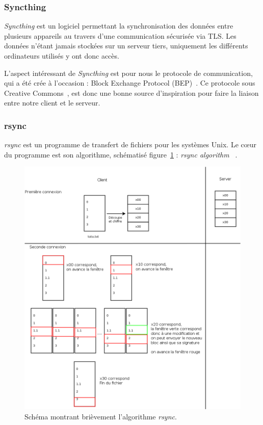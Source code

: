 \documentclass[a4paper,10pt, twoside]{report}
\begin{document}
\begin{spacing}{1.2}
\subsubsection{Syncthing}

\textit{Syncthing} est un logiciel permettant la synchronisation des données
entre plusieurs appareils au travers d'une communication sécurisée via TLS.
Les données n'étant jamais stockées sur un serveur tiers, uniquement les
différents ordinateurs utilisés y ont donc accès.

L'aspect intéressant de \textit{Syncthing} est pour nous le protocole de
communication, qui a été crée à l'occasion : Block Exchange Protocol
(BEP)~\cite{refBEP}. Ce protocole sous Creative Commons~\cite{refCC4.0}, est
donc une bonne source d'inspiration pour faire la liaison entre notre client
et le serveur.

\subsubsection{rsync}

\textit{rsync} est un programme de transfert de fichiers pour les systèmes
Unix. Le c\oe ur du programme est son algorithme, schématisé
figure~\ref{rsyncAlgo} :
\textit{\flqq rsync algorithm \frqq}~\cite{refRsyncAlgo}.

\begin{figure}[h!]
    \centering
    \includegraphics[width=15cm]{algo/rsyncalgo.png}
    \caption{\label{rsyncAlgo} Schéma montrant brièvement
    l'algorithme \textit{rsync}.}
\end{figure}


\end{spacing}
\end{document}
